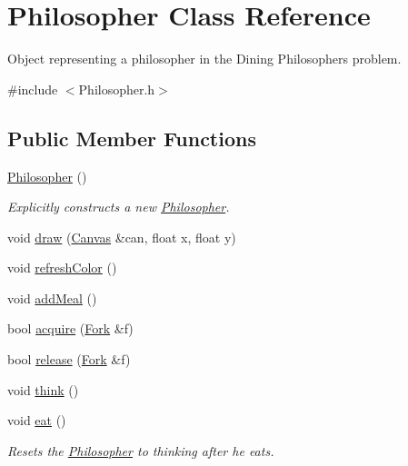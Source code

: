 \hypertarget{class_philosopher}{}\section{Philosopher Class Reference}
\label{class_philosopher}


Object representing a philosopher in the Dining Philosophers\textquotesingle{} problem.  




{\ttfamily \#include $<$Philosopher.\+h$>$}

\subsection*{Public Member Functions}
\begin{DoxyCompactItemize}
\item 
\hyperlink{class_philosopher_affffff67acd52b945fb91277c52af8a3}{Philosopher} ()
\begin{DoxyCompactList}\small\item\em Explicitly constructs a new \hyperlink{class_philosopher}{Philosopher}. \end{DoxyCompactList}\item 
void \hyperlink{class_philosopher_a0b49a5a22cd608ce3ac73211df0d3f45}{draw} (\hyperlink{classtsgl_1_1_canvas}{Canvas} \&can, float x, float y)
\item 
void \hyperlink{class_philosopher_ae0d341934c25f1303ea0c16228e9eeae}{refresh\+Color} ()
\item 
void \hyperlink{class_philosopher_a5e5cfa25abdbca70a5d9ae725d8df7ea}{add\+Meal} ()
\item 
bool \hyperlink{class_philosopher_a7658c8e95d7895246251b494b033d2e3}{acquire} (\hyperlink{struct_fork}{Fork} \&f)
\item 
bool \hyperlink{class_philosopher_a0d229ee7b31b4ccd530fced5424f84a9}{release} (\hyperlink{struct_fork}{Fork} \&f)
\item 
void \hyperlink{class_philosopher_adb8c98df2b7cf8f2d2cde2daa18c731a}{think} ()
\item 
\mbox{\label{class_philosopher_a0115c91983e00c09663f36a7b275e1bd}} 
void \hyperlink{class_philosopher_a0115c91983e00c09663f36a7b275e1bd}{eat} ()
\begin{DoxyCompactList}\small\item\em Resets the \hyperlink{class_philosopher}{Philosopher} to thinking after he eats. \end{DoxyCompactList}\item 

\end{DoxyCompactItemize}
